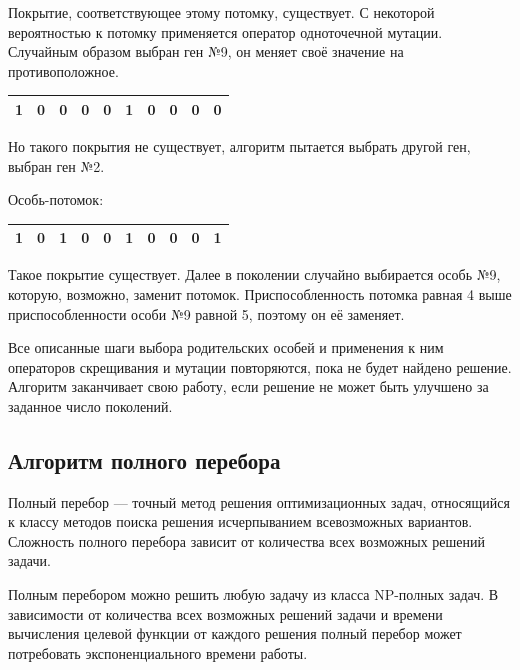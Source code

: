 Покрытие, соответствующее этому потомку, существует. С некоторой вероятностью к потомку применяется оператор одноточечной мутации. Случайным образом выбран ген №9, он меняет своё значение на противоположное.
\begin{table}[H]
	\centering
	\begin{threeparttable}
		\begin{tabular}{|c|c|c|c|c|c|c|c|c|c|}
			\hline
			1& 0& 0& 0& 0& 1& 0& 0& 0& 0 \\\hline
		\end{tabular}
	\end{threeparttable}
\end{table}
Но такого покрытия не существует, алгоритм пытается выбрать другой ген, выбран ген №2.

Особь-потомок:
\begin{table}[H]
	\centering
	\begin{threeparttable}
		\begin{tabular}{|c|c|c|c|c|c|c|c|c|c|}
			\hline
			1& 0& 1& 0& 0& 1& 0& 0& 0& 1 \\\hline
		\end{tabular}
	\end{threeparttable}
\end{table}

Такое покрытие существует. Далее в поколении случайно выбирается особь №9, которую, возможно, заменит потомок. Приспособленность потомка равная 4 выше приспособленности особи №9 равной 5, поэтому он её заменяет.

Все описанные шаги выбора родительских особей и применения к ним операторов скрещивания и мутации повторяются, пока не будет найдено решение. Алгоритм заканчивает свою работу, если решение не может быть улучшено за заданное число поколений.

\subsection{Алгоритм полного перебора}

Полный перебор --- точный метод решения оптимизационных задач, относящийся к классу методов поиска решения исчерпыванием всевозможных вариантов. Сложность полного перебора зависит от количества всех возможных решений задачи. 

Полным перебором можно решить любую задачу из класса NP-полных задач. В зависимости от количества всех возможных решений задачи и времени вычисления целевой функции от каждого решения полный перебор может потребовать экспоненциального времени работы.


